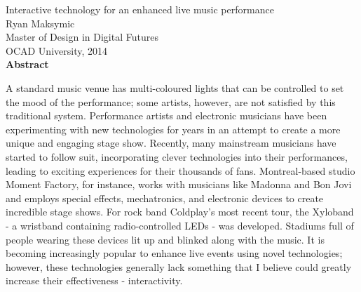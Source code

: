 \begin{center}
{Interactive technology for an enhanced live music performance\\
Ryan Maksymic\\
Master of Design in Digital Futures\\
OCAD University, 2014\\[0.75cm]
\large\textbf{Abstract}}\\[0.5cm]
\end{center}

A standard music venue has multi-coloured lights that can be controlled to set the mood of the performance; some artists, however, are not satisfied by this traditional system. Performance artists and electronic musicians have been experimenting with new technologies for years in an attempt to create a more unique and engaging stage show. Recently, many mainstream musicians have started to follow suit, incorporating clever technologies into their performances, leading to exciting experiences for their thousands of fans. Montreal-based studio Moment Factory, for instance, works with musicians like Madonna and Bon Jovi and employs special effects, mechatronics, and electronic devices to create incredible stage shows. For rock band Coldplay's most recent tour, the Xyloband - a wristband containing radio-controlled LEDs - was developed. Stadiums full of people wearing these devices lit up and blinked along with the music. It is becoming increasingly popular to enhance live events using novel technologies; however, these technologies generally lack something that I believe could greatly increase their effectiveness - interactivity.